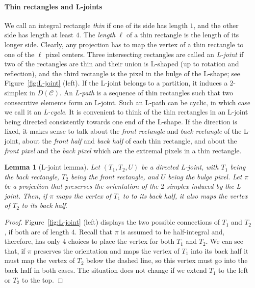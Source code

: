 \documentclass[12pt]{article}
\newcommand{\partition}{\mathcal{C}}
\newtheorem{lemma}[theorem]{Lemma}
\begin{document}
\paragraph{Thin rectangles and L-joints}
We call an integral rectangle \emph{thin} if one of its side has length $1$, and the 
other side has length at least $4$.
The \emph{length} $\ell$ of a thin rectangle is the length of its longer side. 
Clearly, any projection has to map the vertex of a thin rectangle 
to one of the $\ell$ pixel centers.
Three intersecting rectangles are called an \emph{L-joint} if two of the rectangles
are thin and their union is L-shaped (up to rotation and reflection), and the third
rectangle is the pixel in the bulge of the L-shape; see Figure~\ref{fig:L-joint} (left).
If the L-joint belongs to a partition, it induces a $2$-simplex in $D(\partition)$.
An \emph{L-path} is a sequence of thin rectangles such that two consecutive elements
form an L-joint.
Such an L-path can be cyclic, in which case we call it an \emph{L-cycle}.
It is convenient to think of the thin rectangles in an L-joint being directed consistently
towards one end of the L-shape. If the direction is fixed, it makes sense to talk
about the \emph{front rectangle} and \emph{back rectangle} of the L-joint, 
about the \emph{front half} and \emph{back half} of each thin rectangle, and about 
the \emph{front pixel} and the \emph{back pixel} 
which are the extremal pixels in a thin rectangle.

\begin{lemma}[L-joint lemma]\label{lem:L-joint}
Let $(T_1,T_2,U)$ be a directed L-joint, with $T_1$ being the back rectangle, $T_2$
being the front rectangle, and $U$ being the bulge pixel. Let $\pi$ be a projection
that preserves the orientation of the $2$-simplex induced by the L-joint.
Then, if $\pi$ maps the vertex of $T_1$ to to its back half, it also maps the vertex of $T_2$
to its back half.
\end{lemma}
\begin{proof}
Figure~\ref{fig:L-joint} (left) displays the two possible connections of $T_1$ and $T_2$,
if both are of length $4$. 
Recall that $\pi$ is assumed to be half-integral and, therefore, has only $4$ choices to
place the vertex for both $T_1$ and $T_2$.
We can see that, if $\pi$ preserves the orientation
and maps the vertex of $T_1$ into its back half 
it must map the vertex of $T_2$ below the dashed line, so this vertex
must go into the back half in
both cases. The situation does not change if we extend $T_1$ to the left or $T_{2}$
to the top.
\end{proof}
\end{document}
